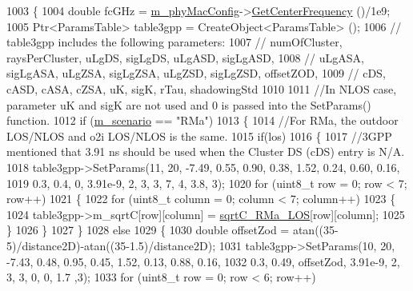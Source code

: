 \begin{DoxyCode}
1003 \{
1004         \textcolor{keywordtype}{double} fcGHz = \hyperlink{classns3_1_1MmWave3gppChannel_a50988766af948ea236ce24718a6dca7d}{m\_phyMacConfig}->\hyperlink{classns3_1_1MmWavePhyMacCommon_a0850d2e37c7075b9bce242723b722019}{GetCenterFrequency} ()/1e9;
1005         Ptr<ParamsTable> table3gpp = CreateObject<ParamsTable> ();
1006         \textcolor{comment}{// table3gpp includes the following parameters:}
1007         \textcolor{comment}{// numOfCluster, raysPerCluster, uLgDS, sigLgDS, uLgASD, sigLgASD,}
1008         \textcolor{comment}{// uLgASA, sigLgASA, uLgZSA, sigLgZSA, uLgZSD, sigLgZSD, offsetZOD,}
1009         \textcolor{comment}{// cDS, cASD, cASA, cZSA, uK, sigK, rTau, shadowingStd}
1010 
1011         \textcolor{comment}{//In NLOS case, parameter uK and sigK are not used and 0 is passed into the SetParams() function.}
1012         \textcolor{keywordflow}{if} (\hyperlink{classns3_1_1MmWave3gppChannel_ae1f263fbc87682905d563221343e4447}{m\_scenario} == \textcolor{stringliteral}{"RMa"})
1013         \{
1014                 \textcolor{comment}{//For RMa, the outdoor LOS/NLOS and o2i LOS/NLOS is the same.}
1015                 \textcolor{keywordflow}{if}(los)
1016                 \{
1017                         \textcolor{comment}{//3GPP mentioned that 3.91 ns should be used when the Cluster DS (cDS) entry is
       N/A.}
1018                         table3gpp->SetParams(11, 20, -7.49, 0.55, 0.90, 0.38, 1.52, 0.24, 0.60, 0.16,
1019                                         0.3, 0.4, 0, 3.91e-9, 2, 3, 3, 7, 4, 3.8, 3);
1020                         \textcolor{keywordflow}{for} (uint8\_t row = 0; row < 7; row++)
1021                         \{
1022                                 \textcolor{keywordflow}{for} (uint8\_t column = 0; column < 7; column++)
1023                                 \{
1024                                         table3gpp->m\_sqrtC[row][column] = 
      \hyperlink{namespacens3_a94d0f9da9e007c8579b09abe4c003e51}{sqrtC\_RMa\_LOS}[row][column];
1025                                 \}
1026                         \}
1027                 \}
1028                 \textcolor{keywordflow}{else}
1029                 \{
1030                         \textcolor{keywordtype}{double} offsetZod = atan((35-5)/distance2D)-atan((35-1.5)/distance2D);
1031                         table3gpp->SetParams(10, 20, -7.43, 0.48, 0.95, 0.45, 1.52, 0.13, 0.88, 0.16,
1032                                         0.3, 0.49, offsetZod, 3.91e-9, 2, 3, 3, 0, 0, 1.7 ,3);
1033                         \textcolor{keywordflow}{for} (uint8\_t row = 0; row < 6; row++)

\end{DoxyCode}

